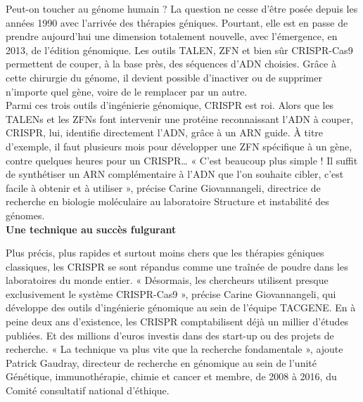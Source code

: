 \documentclass[8pt]{article}
\begin{document}
Peut-on toucher au génome humain ? La question ne cesse d’être posée depuis les années 1990 avec l’arrivée des thérapies géniques. Pourtant, elle est en passe de prendre aujourd’hui une dimension totalement nouvelle, avec l’émergence, en 2013, de l’édition génomique. Les outils TALEN, ZFN et bien sûr CRISPR-Cas9 permettent de couper, à la base près, des séquences d’ADN choisies. Grâce à cette chirurgie du génome, il ­devient possible d’inactiver ou de supprimer n’importe quel gène, voire de le remplacer par un autre. \\

Parmi ces trois outils d’ingénierie génomique, CRISPR est roi. Alors que les TALENs et les ZFNs font intervenir une protéine reconnaissant l’ADN à couper, CRISPR, lui, identifie directement l’ADN, grâce à un ARN guide. À titre d’exemple, il faut plusieurs mois pour développer une ZFN spécifique à un gène, contre quelques heures pour un CRISPR… « C’est beaucoup plus simple ! Il suffit de synthétiser un ARN complémentaire à l’ADN que l’on souhaite cibler, c’est facile à obtenir et à utiliser », précise Carine Giovannangeli, directrice de recherche en biologie moléculaire au laboratoire Structure et instabilité des génomes. \\

\textbf{Une technique au succès fulgurant}

Plus précis, plus rapides et surtout moins chers que les thérapies géniques classiques, les CRISPR se sont répandus comme une traînée de poudre dans les laboratoires du monde entier. « Désormais, les chercheurs utilisent presque exclusivement le système CRISPR-Cas9 », précise Carine Giovannangeli, qui développe des outils d’ingénierie génomique au sein de l’équipe TACGENE. En à peine deux ans d’existence, les CRISPR comptabilisent déjà un millier d’études publiées. Et des millions d’euros investis dans des start-up ou des projets de recherche. « La technique va plus vite que la recherche fondamentale », ajoute Patrick Gaudray, directeur de recherche en génomique au sein de l’unité Génétique, immunothérapie, chimie et cancer et membre, de 2008 à 2016, du Comité consultatif national d’éthique. \\
\end{document}
